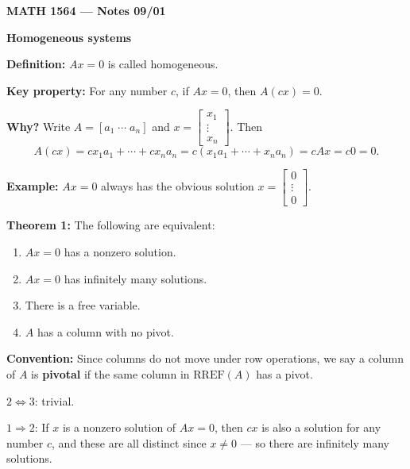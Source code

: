 \documentclass{article}
\begin{document}
\textbf{MATH 1564 --- Notes 09/01}

\bigskip

\textbf{Homogeneous systems}

\medskip

\textbf{Definition:} $Ax = 0$ is called homogeneous.

\medskip

\textbf{Key property:} For any number $c$, if $Ax = 0$, then $A(cx) = 0$.

\medskip

\textbf{Why?} Write $A = [a_1 \; \cdots \; a_n]$ and $x = \begin{bmatrix} x_1 \\ \vdots \\ x_n \end{bmatrix}$. Then
\[
A(cx) = cx_1 a_1 + \cdots + cx_n a_n = c(x_1 a_1 + \cdots + x_n a_n) = cAx = c0 = 0.
\]

\medskip

\textbf{Example:} $Ax = 0$ always has the obvious solution $x = \begin{bmatrix} 0 \\ \vdots \\ 0 \end{bmatrix}$.

\newpage

\textbf{Theorem 1:} The following are equivalent:
\begin{enumerate}
\item $Ax = 0$ has a nonzero solution.
\item $Ax = 0$ has infinitely many solutions.
\item There is a free variable.
\item $A$ has a column with no pivot.
\end{enumerate}

\bigskip

\textbf{Convention:} Since columns do not move under row operations, we say a column of $A$ is \textbf{pivotal} if the same column in $\mathrm{RREF}(A)$ has a pivot.

\bigskip

$2 \iff 3$: trivial.

\medskip

$1 \Rightarrow 2$: If $x$ is a nonzero solution of $Ax = 0$, then $cx$ is also a solution for any number $c$, and these are all distinct since $x \neq 0$ --- so there are infinitely many solutions.

\medskip
\end{document}
